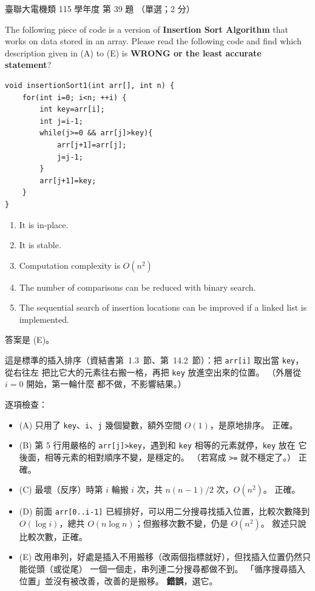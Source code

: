 \begin{pastexam}[label={px:ust-115-ee-ds-39}]{臺聯大電機類 115 學年度 第 39 題}
（單選；2 分）

The following piece of code is a version of \textbf{Insertion Sort Algorithm} that works on data
stored in an array. Please read the following code and find which description given in (A) to (E)
is \textbf{WRONG or the least accurate statement}?
\begin{verbatim}
void insertionSort1(int arr[], int n) {
    for(int i=0; i<n; ++i) {
        int key=arr[i];
        int j=i-1;
        while(j>=0 && arr[j]>key){
            arr[j+1]=arr[j];
            j=j-1;
        }
        arr[j+1]=key;
    }
}
\end{verbatim}
\begin{enumerate}[label=(\Alph*)]
\item It is in-place.
\item It is stable.
\item Computation complexity is $O(n^2)$
\item The number of comparisons can be reduced with binary search.
\item The sequential search of insertion locations can be improved if a linked list is implemented.
\end{enumerate}
\end{pastexam}

\begin{pastsoln}
答案是 (E)。

這是標準的插入排序（資結書第~1.3~節、第~14.2~節）：把 \texttt{arr[i]} 取出當 \texttt{key}，從右往左
把比它大的元素往右搬一格，再把 \texttt{key} 放進空出來的位置。 （外層從 $i = 0$ 開始，第一輪什麼
都不做，不影響結果。）

逐項檢查：
\begin{itemize}
\item (A) 只用了 \texttt{key}、\texttt{i}、\texttt{j} 幾個變數，額外空間 $O(1)$，是原地排序。 正確。
\item (B) 第 5 行用嚴格的 \texttt{arr[j]>key}，遇到和 \texttt{key} 相等的元素就停，\texttt{key} 放在
它後面，相等元素的相對順序不變，是穩定的。 （若寫成 \texttt{>=} 就不穩定了。） 正確。
\item (C) 最壞（反序）時第 $i$ 輪搬 $i$ 次，共 $n(n-1)/2$ 次，$O(n^2)$。 正確。
\item (D) 前面 \texttt{arr[0..i-1]} 已經排好，可以用二分搜尋找插入位置，比較次數降到
$O(\log i)$，總共 $O(n \log n)$；但搬移次數不變，仍是 $O(n^2)$。 敘述只說比較次數，正確。
\item (E) 改用串列，好處是插入不用搬移（改兩個指標就好），但找插入位置仍然只能從頭（或從尾）
一個一個走，串列連二分搜尋都做不到。 「循序搜尋插入位置」並沒有被改善，改善的是搬移。
\textbf{錯誤}，選它。
\end{itemize}
\end{pastsoln}
